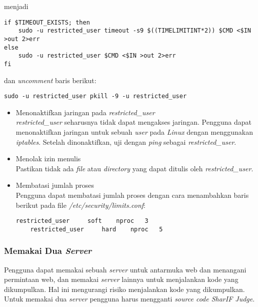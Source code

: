 menjadi

\begin{lstlisting}[basicstyle=\ttfamily, frame=single,
columns=fullflexible, keepspaces=true, breaklines=true, label=ls:15]
if $TIMEOUT_EXISTS; then
	sudo -u restricted_user timeout -s9 $((TIMELIMITINT*2)) $CMD <$IN >out 2>err
else
	sudo -u restricted_user $CMD <$IN >out 2>err        
fi
\end{lstlisting}

dan \textit{uncomment} baris berikut:

\begin{lstlisting}[basicstyle=\ttfamily, frame=single,
columns=fullflexible, keepspaces=true, breaklines=true, label=ls:16]
sudo -u restricted_user pkill -9 -u restricted_user
\end{lstlisting}

\begin{itemize}
	\item Menonaktifkan jaringan pada \textit{restricted\_user} \\
	\textit{restricted\_user} seharusnya tidak dapat mengakses jaringan. Pengguna dapat menonaktifkan jaringan untuk sebuah \textit{user} pada \textit{Linux} dengan menggunakan \textit{iptables}. Setelah dinonaktifkan, uji dengan \textit{ping} sebagai \textit{restricted\_user}.
	
	\item Menolak izin menulis \\
	Pastikan tidak ada \textit{file} atau \textit{directory} yang dapat ditulis oleh \textit{restricted\_user}.
	
	\item Membatasi jumlah proses \\
	Pengguna dapat membatasi jumlah proses dengan cara menambahkan baris berikut pada file \textit{/etc/security/limits.conf}:
	
	\begin{lstlisting}[basicstyle=\ttfamily, frame=single,
	columns=fullflexible, keepspaces=true, breaklines=true, label=ls:17]
	restricted_user     soft    nproc   3
	restricted_user     hard    nproc   5
	\end{lstlisting}
	
\end{itemize}

\subsubsection{Memakai Dua \textit{Server}}
\label{subsubsec:memakai_dua_server}
Pengguna dapat memakai sebuah \textit{server} untuk antarmuka web dan menangani permintaan web, dan memakai \textit{server} lainnya untuk menjalankan kode yang dikumpulkan. Hal ini mengurangi risiko menjalankan kode yang dikumpulkan. Untuk memakai dua \textit{server} pengguna harus mengganti \textit{source code SharIF Judge}. 



